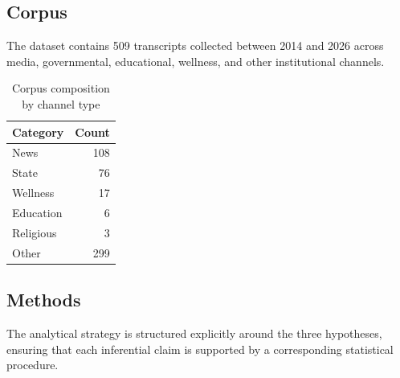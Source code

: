 \documentclass[11pt]{article}
\begin{document}
\subsection{Corpus}



The dataset contains 509 transcripts collected between 2014 and 2026 across media, governmental, educational, wellness, and other institutional channels.



\begin{table}[H]

\centering

\begin{tabular}{lr}

\toprule

Category & Count \\

\midrule

News & 108 \\

State & 76 \\

Wellness & 17 \\

Education & 6 \\

Religious & 3 \\

Other & 299 \\

\bottomrule

\end{tabular}

\caption{Corpus composition by channel type}

\end{table}



\subsection{Methods}

The analytical strategy is structured explicitly around the three hypotheses, ensuring that each inferential claim is supported by a corresponding statistical procedure.
\end{document}
